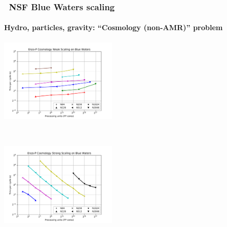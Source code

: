 \begin{frame}[fragile]
  \frametitle{\enzopcello\ NSF Blue Waters scaling}
  \framesubtitle{Hydro, particles, gravity: ``Cosmology (non-AMR)'' problem}
  \begin{center}
    \vspace{-0.1in}
    \begin{minipage}{4.5in}
      \begin{center}
        \begin{minipage}{2.in}
          \includegraphics[width=2.2in]{Images/Scaling/smp-cosmo-weak.pdf}
        \end{minipage} \ 
        \begin{minipage}{2.2in}
          \includegraphics[width=2.2in]{Images/Scaling/smp-cosmo-strong.pdf}
        \end{minipage} \\
      \end{center}
    \end{minipage}
  \end{center}
\end{frame}
